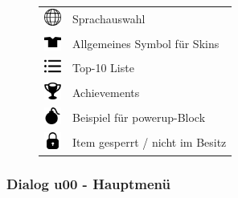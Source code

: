 \begin{figure}[h!]
\begin{center}
\begin{tabular}{ll}
            \includegraphics[width=1.5em,height=1.5em]{diagramme/assets/Globe-256.png} & Sprachauswahl \\
            \includegraphics[width=1.5em,height=1.5em]{diagramme/assets/Shirt-256.png} & Allgemeines Symbol für Skins \\
            \includegraphics[width=1.5em,height=1.5em]{diagramme/assets/list.png} & Top-10 Liste \\
            \includegraphics[width=1.5em,height=1.5em]{diagramme/assets/Trophy-256.png} & Achievements \\
            \includegraphics[width=1.5em,height=1.5em]{diagramme/assets/Bomb-256.png} & Beispiel für \gls{powerup}-Block \\    
            \includegraphics[width=1.5em,height=1.5em]{diagramme/assets/Lock-256.png} & Item gesperrt / nicht im Besitz
        \end{tabular}
    \end{center}
    \label{fig:dia:icons}
\end{figure}
\setlength{\extrarowheight}{0.5em}

\clearpage

\subsubsection{Dialog u00 - Hauptmenü}\label{dialog:hauptmenu}

